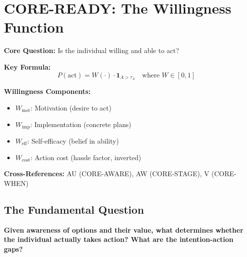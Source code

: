 \chapter{CORE-READY: The Willingness Function}
\label{app:core-ready}

\begin{abstract}
This appendix answers the seventh fundamental question:
\textit{``Is the individual willing and able to act?''}
Awareness alone does not guarantee action. The Willingness Function $W(\cdot)$
captures motivational barriers, implementation intentions, action costs, and
self-efficacy that determine whether potential actions become actual behavior.
\end{abstract}

\begin{tcolorbox}[colback=blue!5!white, colframe=blue!75!black,
    title=Quick Reference: CORE-READY]

\textbf{Core Question:} Is the individual willing and able to act?

\textbf{Key Formula:}
\begin{equation}
P(\text{act}) = W(\cdot) \cdot \mathbf{1}_{A > \tau_A} \quad \text{where } W \in [0, 1]
\label{eq:ready-action}
\end{equation}

\textbf{Willingness Components:}
\begin{itemize}[nosep]
\item $W_{\text{mot}}$: Motivation (desire to act)
\item $W_{\text{imp}}$: Implementation (concrete plans)
\item $W_{\text{eff}}$: Self-efficacy (belief in ability)
\item $W_{\text{cost}}$: Action cost (hassle factor, inverted)
\end{itemize}

\textbf{Cross-References:}
AU (CORE-AWARE), AW (CORE-STAGE), V (CORE-WHEN)

\end{tcolorbox}

\section{The Fundamental Question}
\label{sec:ready-fundamental}

\begin{tcolorbox}[colback=red!5!white, colframe=red!75!black,
    title=The Fundamental Question]
\textbf{Given awareness of options and their value, what determines whether
the individual actually takes action? What are the intention-action gaps?}
\end{tcolorbox}

